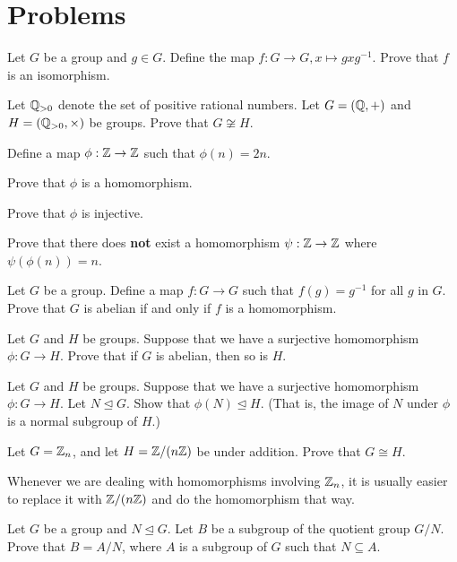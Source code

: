 \newpage

\section{Problems}
\begin{problem}
    Let $G$ be a group and $g \in G$. Define the map $f: G \to G, x \mapsto gxg^{-1}$. Prove that $f$ is an isomorphism.
\end{problem}

\begin{problem}
    Let $\mathbb{Q}_{>0}$ denote the set of positive rational numbers. Let $G = (\mathbb{Q}, +)$ and $H = (\mathbb{Q}_{>0}, \times)$ be groups. Prove that $G \not\cong H$.
\end{problem}

\begin{problem}
    Define a map $\phi: \mathbb{Z} \to \mathbb{Z}$ such that $\phi(n) = 2n$.
    \begin{partquestions}{\alph*}
        \item Prove that $\phi$ is a homomorphism.
        \item Prove that $\phi$ is injective.
        \item Prove that there does \textbf{not} exist a homomorphism $\psi: \mathbb{Z} \to \mathbb{Z}$ where $\psi(\phi(n)) = n$.
    \end{partquestions}
\end{problem}

\begin{problem}
    Let $G$ be a group. Define a map $f: G \to G$ such that $f(g) = g^{-1}$ for all $g$ in $G$. Prove that $G$ is abelian if and only if $f$ is a homomorphism.
\end{problem}

\begin{problem}
    Let $G$ and $H$ be groups. Suppose that we have a surjective homomorphism $\phi: G \to H$. Prove that if $G$ is abelian, then so is $H$.
\end{problem}

\begin{problem}
    Let $G$ and $H$ be groups. Suppose that we have a surjective homomorphism $\phi: G \to H$. Let $N \unlhd G$. Show that $\phi(N) \unlhd H$.\newline
    (That is, the image of $N$ under $\phi$ is a normal subgroup of $H$.)
\end{problem}

\begin{problem}\label{problem-Zn-isomorphic-to-Z-by-nZ}
    Let $G = \mathbb{Z}_n$, and let $H = \mathbb{Z}/(n\mathbb{Z})$ be under addition. Prove that $G \cong H$.
\end{problem}
\begin{remark}
    Whenever we are dealing with homomorphisms involving $\mathbb{Z}_n$, it is usually easier to replace it with $\mathbb{Z}/(n\mathbb{Z})$ and do the homomorphism that way.
\end{remark}

\begin{problem}\label{problem-subgroup-of-quotient-group-is-quotient-group}
    Let $G$ be a group and $N \unlhd G$. Let $B$ be a subgroup of the quotient group $G/N$. Prove that $B = A/N$, where $A$ is a subgroup of $G$ such that $N \subseteq A$.
\end{problem}
